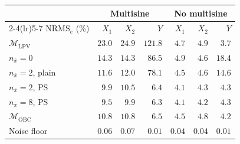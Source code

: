 \setlength{\tabcolsep}{3pt}
\begin{tabular}{l r r r r r r }
\toprule
 & \multicolumn{3}{c}{Multisine} & \multicolumn{3}{c}{No multisine}\\
\cmidrule(lr){2-4}\cmidrule(lr){5-7}
$\mathrm{NRMS}_e$ (\%) & $X_1$ & $X_2$ & $Y$ & $X_1$ & $X_2$ & $Y$\\
\midrule
$\mathcal{M}_{\mathrm{LPV}}$ & $23.0$ & $24.9$ & $121.8$ & $4.7$ & $4.9$ & $3.7$\\
$n_{\bar x}=0$ & $14.3$ & $14.3$ & $86.5$ & $4.9$ & $4.6$ & $18.4$\\
$n_{\bar x}=2$, plain & $11.6$ & $12.0$ & $78.1$ & $4.5$ & $4.6$ & $14.6$\\
$n_{\bar x}=2$, PS & $9.9$ & $10.5$ & $6.4$ & $4.1$ & $4.3$ & $4.3$\\
$n_{\bar x}=8$, PS & $9.5$ & $9.9$ & $6.3$ & $4.1$ & $4.2$ & $4.3$\\
\midrule
$\mathcal{M}_{\mathrm{OBC}}$ & $10.8$ & $10.8$ & $6.5$ & $4.5$ & $4.8$ & $4.2$\\
\midrule
Noise floor & $0.06$ & $0.07$ & $0.01$ & $0.04$ & $0.04$ & $0.01$\\
\bottomrule
\end{tabular}
